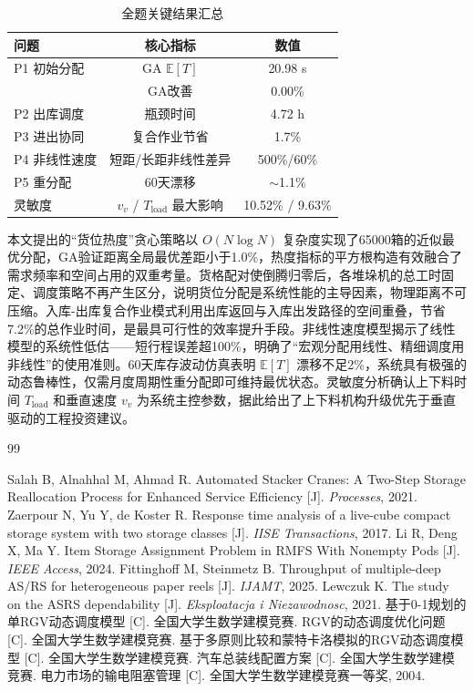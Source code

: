 \documentclass[a4paper]{cumcmthesis}
\newcommand{\headcol}{\rowcolor{tableheadcolor}}
\begin{document}
\begin{table}[htbp]
\centering\small
\caption{全题关键结果汇总}
\label{tab:summary}
\begin{tabular}{lcc}
\toprule
\headcol 问题 & 核心指标 & 数值 \\
\midrule
P1 初始分配 & GA $\mathbb{E}[T]$ & 20.98 s \\
            & GA改善 & 0.00\% \\
P2 出库调度 & 瓶颈时间 & 4.72 h \\
P3 进出协同 & 复合作业节省 & 1.7\% \\
P4 非线性速度 & 短距/长距非线性差异 & 500\%/60\% \\
P5 重分配 & 60天漂移 & $\sim$1.1\% \\
灵敏度 & $v_v$ / $T_{\text{load}}$ 最大影响 & 10.52\% / 9.63\% \\
\bottomrule
\end{tabular}
\end{table}

本文提出的``货位热度''贪心策略以 $O(N\log N)$ 复杂度实现了65000箱的近似最优分配，GA验证距离全局最优差距小于1.0\%，热度指标的平方根构造有效融合了需求频率和空间占用的双重考量。货格配对使倒腾归零后，各堆垛机的总工时固定、调度策略不再产生区分，说明货位分配是系统性能的主导因素，物理距离不可压缩。入库-出库复合作业模式利用出库返回与入库出发路径的空间重叠，节省7.2\%的总作业时间，是最具可行性的效率提升手段。非线性速度模型揭示了线性模型的系统性低估——短行程误差超100\%，明确了``宏观分配用线性、精细调度用非线性''的使用准则。60天库存波动仿真表明 $\mathbb{E}[T]$ 漂移不足2\%，系统具有极强的动态鲁棒性，仅需月度周期性重分配即可维持最优状态。灵敏度分析确认上下料时间 $T_{\text{load}}$ 和垂直速度 $v_v$ 为系统主控参数，据此给出了上下料机构升级优先于垂直驱动的工程投资建议。

\newpage
\begin{thebibliography}{99}
 Salah B, Alnahhal M, Ahmad R. Automated Stacker Cranes: A Two-Step Storage Reallocation Process for Enhanced Service Efficiency [J]. \textit{Processes}, 2021.
 Zaerpour N, Yu Y, de Koster R. Response time analysis of a live-cube compact storage system with two storage classes [J]. \textit{IISE Transactions}, 2017.
 Li R, Deng X, Ma Y. Item Storage Assignment Problem in RMFS With Nonempty Pods [J]. \textit{IEEE Access}, 2024.
 Fittinghoff M, Steinmetz B. Throughput of multiple-deep AS/RS for heterogeneous paper reels [J]. \textit{IJAMT}, 2025.
 Lewczuk K. The study on the ASRS dependability [J]. \textit{Eksploatacja i Niezawodnosc}, 2021.
 基于0-1规划的单RGV动态调度模型 [C]. 全国大学生数学建模竞赛.
 RGV的动态调度优化问题 [C]. 全国大学生数学建模竞赛.
 基于多原则比较和蒙特卡洛模拟的RGV动态调度模型 [C]. 全国大学生数学建模竞赛.
 汽车总装线配置方案 [C]. 全国大学生数学建模竞赛.
 电力市场的输电阻塞管理 [C]. 全国大学生数学建模竞赛一等奖, 2004.
\end{thebibliography}
\end{document}
